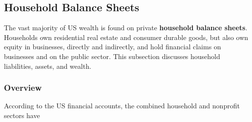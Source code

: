 \subsection*{Household Balance Sheets} \hypertarget{hhbs}{\label{hhbs}} 
\begin{minipage}{0.76\textwidth}
   

\small The vast majority of US wealth is found on private \textbf{household balance sheets}. Households own residential real estate and consumer durable goods, but also own equity in businesses, directly and indirectly, and hold financial claims on businesses and on the public sector. This subsection discusses household liabilities, assets, and wealth.
\end{minipage}

\subsubsection*{Overview}
\vspace*{-0.5mm}
\begin{minipage}{0.76\textwidth}
\small According to the US financial accounts, the combined household and nonprofit sectors have 
\end{minipage}


